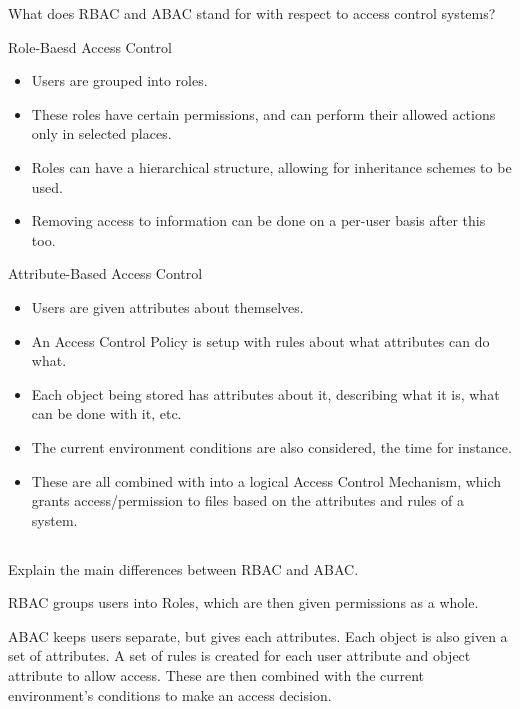 \begin{questions}
\question{} What does RBAC and ABAC stand for with respect to access control systems?
  \begin{solution}
    \begin{description}[noitemsep]
    \item[RBAC] Role-Baesd Access Control
      \begin{itemize}[noitemsep]
      \item Users are grouped into roles.
      \item These roles have certain permissions, and can perform their allowed actions only in selected places.
      \item Roles can have a hierarchical structure, allowing for inheritance schemes to be used.
      \item Removing access to information can be done on a per-user basis after this too.
      \end{itemize}
    \item[ABAC] Attribute-Based Access Control
      \begin{itemize}[noitemsep]
      \item Users are given attributes about themselves.
      \item An Access Control Policy is setup with rules about what attributes can do what.
      \item Each object being stored has attributes about it, describing what it is, what can be done with it, etc.
      \item The current environment conditions are also considered, the time for instance.
      \item These are all combined with into a logical Access Control Mechanism, which grants access/permission to files based on the attributes and rules of a system.
      \end{itemize}
    \end{description}
  \end{solution}

  \begin{parts}
  \part{} Explain the main differences between RBAC and ABAC.\@
    \begin{solution}
      RBAC groups users into Roles, which are then given permissions as a whole.

      ABAC keeps users separate, but gives each attributes.
      Each object is also given a set of attributes.
      A set of rules is created for each user attribute and object attribute to allow access.
      These are then combined with the current environment's conditions to make an access decision.
    \end{solution}
  \end{parts}


\end{questions}
